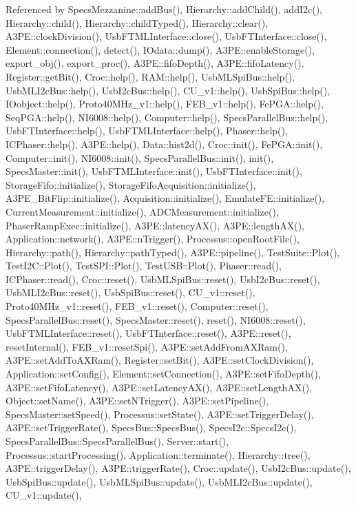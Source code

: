 Referenced by Specs\+Mezzanine\+::add\+Bus(), Hierarchy\+::add\+Child(), add\+I2c(), Hierarchy\+::child(), Hierarchy\+::child\+Typed(), Hierarchy\+::clear(), A3\+P\+E\+::clock\+Division(), Usb\+F\+T\+M\+L\+Interface\+::close(), Usb\+F\+T\+Interface\+::close(), Element\+::connection(), detect(), I\+Odata\+::dump(), A3\+P\+E\+::enable\+Storage(), export\+\_\+obj(), export\+\_\+proc(), A3\+P\+E\+::fifo\+Depth(), A3\+P\+E\+::fifo\+Latency(), Register\+::get\+Bit(), Croc\+::help(), R\+A\+M\+::help(), Usb\+M\+L\+Spi\+Bus\+::help(), Usb\+M\+L\+I2c\+Bus\+::help(), Usb\+I2c\+Bus\+::help(), C\+U\+\_\+v1\+::help(), Usb\+Spi\+Bus\+::help(), I\+Oobject\+::help(), Proto40\+M\+Hz\+\_\+v1\+::help(), F\+E\+B\+\_\+v1\+::help(), Fe\+P\+G\+A\+::help(), Seq\+P\+G\+A\+::help(), N\+I6008\+::help(), Computer\+::help(), Specs\+Parallel\+Bus\+::help(), Usb\+F\+T\+Interface\+::help(), Usb\+F\+T\+M\+L\+Interface\+::help(), Phaser\+::help(), I\+C\+Phaser\+::help(), A3\+P\+E\+::help(), Data\+::hist2d(), Croc\+::init(), Fe\+P\+G\+A\+::init(), Computer\+::init(), N\+I6008\+::init(), Specs\+Parallel\+Bus\+::init(), init(), Specs\+Master\+::init(), Usb\+F\+T\+M\+L\+Interface\+::init(), Usb\+F\+T\+Interface\+::init(), Storage\+Fifo\+::initialize(), Storage\+Fifo\+Acquisition\+::initialize(), A3\+P\+E\+\_\+\+Bit\+Flip\+::initialize(), Acquisition\+::initialize(), Emulate\+F\+E\+::initialize(), Current\+Measurement\+::initialize(), A\+D\+C\+Measurement\+::initialize(), Phaser\+Ramp\+Exec\+::initialize(), A3\+P\+E\+::latency\+A\+X(), A3\+P\+E\+::length\+A\+X(), Application\+::network(), A3\+P\+E\+::n\+Trigger(), Processus\+::open\+Root\+File(), Hierarchy\+::path(), Hierarchy\+::path\+Typed(), A3\+P\+E\+::pipeline(), Test\+Suite\+::\+Plot(), Test\+I2\+C\+::\+Plot(), Test\+S\+P\+I\+::\+Plot(), Test\+U\+S\+B\+::\+Plot(), Phaser\+::read(), I\+C\+Phaser\+::read(), Croc\+::reset(), Usb\+M\+L\+Spi\+Bus\+::reset(), Usb\+I2c\+Bus\+::reset(), Usb\+M\+L\+I2c\+Bus\+::reset(), Usb\+Spi\+Bus\+::reset(), C\+U\+\_\+v1\+::reset(), Proto40\+M\+Hz\+\_\+v1\+::reset(), F\+E\+B\+\_\+v1\+::reset(), Computer\+::reset(), Specs\+Parallel\+Bus\+::reset(), Specs\+Master\+::reset(), reset(), N\+I6008\+::reset(), Usb\+F\+T\+M\+L\+Interface\+::reset(), Usb\+F\+T\+Interface\+::reset(), A3\+P\+E\+::reset(), reset\+Internal(), F\+E\+B\+\_\+v1\+::reset\+Spi(), A3\+P\+E\+::set\+Add\+From\+A\+X\+Ram(), A3\+P\+E\+::set\+Add\+To\+A\+X\+Ram(), Register\+::set\+Bit(), A3\+P\+E\+::set\+Clock\+Division(), Application\+::set\+Config(), Element\+::set\+Connection(), A3\+P\+E\+::set\+Fifo\+Depth(), A3\+P\+E\+::set\+Fifo\+Latency(), A3\+P\+E\+::set\+Latency\+A\+X(), A3\+P\+E\+::set\+Length\+A\+X(), Object\+::set\+Name(), A3\+P\+E\+::set\+N\+Trigger(), A3\+P\+E\+::set\+Pipeline(), Specs\+Master\+::set\+Speed(), Processus\+::set\+State(), A3\+P\+E\+::set\+Trigger\+Delay(), A3\+P\+E\+::set\+Trigger\+Rate(), Specs\+Bus\+::\+Specs\+Bus(), Specs\+I2c\+::\+Specs\+I2c(), Specs\+Parallel\+Bus\+::\+Specs\+Parallel\+Bus(), Server\+::start(), Processus\+::start\+Processing(), Application\+::terminate(), Hierarchy\+::tree(), A3\+P\+E\+::trigger\+Delay(), A3\+P\+E\+::trigger\+Rate(), Croc\+::update(), Usb\+I2c\+Bus\+::update(), Usb\+Spi\+Bus\+::update(), Usb\+M\+L\+Spi\+Bus\+::update(), Usb\+M\+L\+I2c\+Bus\+::update(), C\+U\+\_\+v1\+::update(), 